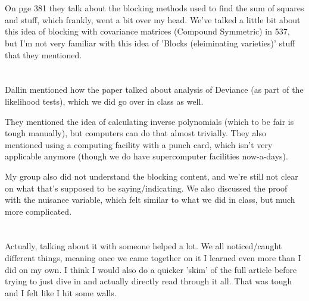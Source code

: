 \documentclass{article}
\begin{document}
\section{}

On pge 381 they talk about the blocking methods used to find the sum of squares and stuff, which frankly, went a bit over my head. We've talked a little bit about this idea of blocking with covariance matrices (Compound Symmetric) in 537, but I'm not very familiar with this idea of 'Blocks (eleiminating varieties)' stuff that they mentioned. 

\section{}

Dallin mentioned how the paper talked about analysis of Deviance (as part of the likelihood tests), which we did go over in class as well. 

They mentioned the idea of calculating inverse polynomials (which to be fair is tough manually), but computers can do that almost trivially. They also mentioned using a computing facility with a punch card, which isn't very applicable anymore (though we do have supercomputer facilities now-a-days).

My group also did not understand the blocking content, and we're still not clear on what that's supposed to be saying/indicating. We also discussed the proof with the nuisance variable, which felt similar to what we did in class, but much more complicated. 

\section{}

Actually, talking about it with someone helped a lot. We all noticed/caught different things, meaning once we came together on it I learned even more than I did on my own. I think I would also do a quicker 'skim' of the full article before trying to just dive in and actually directly read through it all. That was tough and I felt like I hit some walls. 
\end{document}
